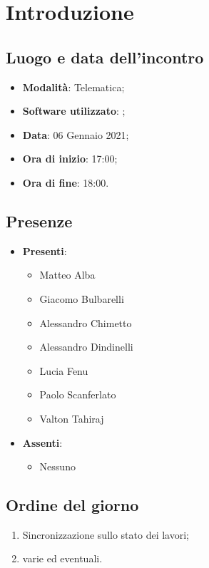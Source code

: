 \documentclass[]{article}
\begin{document}
	
	
	
	\newpage
	
	
		\section{Introduzione}
		\subsection{Luogo e data dell'incontro}
		\begin{itemize}
			\item \textbf{Modalità}: Telematica;
			\item \textbf{Software utilizzato}: ;
			\item \textbf{Data}: 06 Gennaio 2021;
			\item \textbf{Ora di inizio}: 17:00;
			\item \textbf{Ora di fine}: 18:00.
		\end{itemize}

		\subsection{Presenze}
		\begin{itemize}
			\item \textbf{Presenti}:
			\begin{itemize}
				\item Matteo Alba
				\item Giacomo Bulbarelli
				\item Alessandro Chimetto
				\item Alessandro Dindinelli
				\item Lucia Fenu
				\item Paolo Scanferlato
				\item Valton Tahiraj
			\end{itemize}
			\item \textbf{Assenti}:
			\begin{itemize}
				\item Nessuno
			\end{itemize}
		\end{itemize}


		\subsection{Ordine del giorno}
		\begin{enumerate}
			\item Sincronizzazione sullo stato dei lavori;
			\item varie ed eventuali.
		\end{enumerate}
\end{document}

